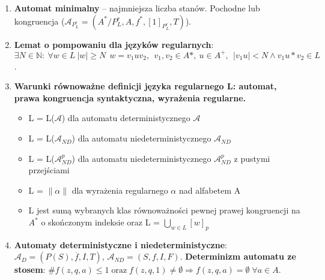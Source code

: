 \documentclass[12pt]{article}
\begin{document}
\begin{enumerate}
        \item \textbf{Automat minimalny} -- najmniejsza liczba stanów.
        Pochodne lub kongruencja
        ($\mathcal{A}_{P_{L}^{r}} = (A^{*} / P_{L}^{r}, A, f^{*}, [1]_{P_{L}^{r}}, T)$).

        \item \textbf{Lemat o pompowaniu dla języków regularnych}: $\exists N \in \mathbb{N}: ~ \forall w \in L ~ |w| \geq N
        ~~ w = v_1 u v_2, ~~ v_1, v_2 \in A*, ~ u \in A^+, ~~ |v_1 u| < N \wedge v_1 u* v_2 \in L$.

        \item \textbf{Warunki równoważne definicji języka regularnego L: automat, prawa kongruencja syntaktyczna, wyrażenia regularne.}
        \begin{itemize}[noitemsep]
            \item L = L($\mathcal{A}$) dla automatu deterministycznego $\mathcal{A}$
            \item L = L($\mathcal{A}_{ND}$) dla automatu niedeterministycznego $\mathcal{A}_{ND}$
            \item L = L($\mathcal{A}_{ND}^p$) dla automatu niedeterministycznego $\mathcal{A}_{ND}^p$ z pustymi przejściami
            \item L = $\|\alpha\|$ dla wyrażenia regularnego $\alpha$ nad alfabetem A
            \item L jest sumą wybranych klas równoważności pewnej prawej kongruencji na $A^*$
            o skończonym indeksie oraz L = $\bigcup\limits_{w \in L}[w]_p$
        \end{itemize}

        \item \textbf{Automaty deterministyczne i niedeterministyczne}: $\mathcal{A}_D = (P(S), \overline{f}, I, T)$,
        $\mathcal{A}_{ND} = (S, f, I, F)$.  \textbf{Determinizm automatu ze stosem}: $ \# f(z, q, a) \leq 1 \; \mathrm{oraz} \;
        f(z, q, 1) \neq \emptyset \Rightarrow f(z, q, a) = \emptyset \; \forall a \in A$.


\end{enumerate}
\end{document}
